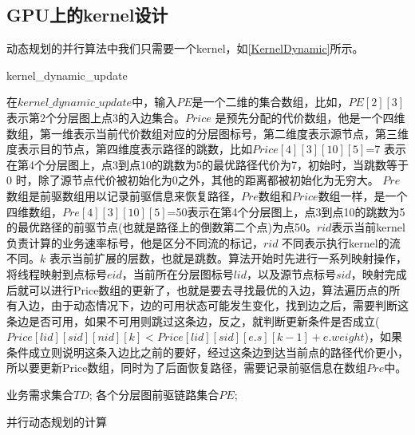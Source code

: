 \subsection{GPU上的kernel设计}
动态规划的并行算法中我们只需要一个kernel，如\ref{KernelDynamic}所示。
\begin{algorithm}[t]
\begin{algorithmic}[1]
\EndIf
\EndIf
\EndFor
\EndFunction
\end{algorithmic}
\caption{kernel\_dynamic\_update}
\label{KernelDynamic}
\end{algorithm}
在$kernel\_dynamic\_update$中，输入$PE$是一个二维的集合数组，比如，$PE[2][3]$表示第2个分层图上点3的入边集合。$Price$ 是预先分配的代价数组，他是一个四维数组，第一维表示当前代价数组对应的分层图标号，第二维度表示源节点，第三维度表示目的节点，第四维度表示路径的跳数，比如$Price[4][3][10][5]$=7 表示在第4个分层图上，点3到点10的跳数为5的最优路径代价为7，初始时，当跳数等于0 时，除了源节点代价被初始化为0之外，其他的距离都被初始化为无穷大。
$Pre$数组是前驱数组用以记录前驱信息来恢复路径，$Pre$数组和$Price$数组一样，是一个四维数组，$Pre[4][3][10][5]$=50表示在第4个分层图上，点3到点10的跳数为5的最优路径的前驱节点(也就是路径上的倒数第二个点)为点50。$rid$表示当前kernel 负责计算的业务速率标号，他是区分不同流的标记，$rid$ 不同表示执行kernel的流不同。$k$ 表示当前扩展的层数，也就是跳数。算法开始时先进行一系列映射操作，将线程映射到点标号$eid$，当前所在分层图标号$lid$，以及源节点标号$sid$，映射完成后就可以进行Price数组的更新了，也就是要去寻找最优的入边，算法遍历点的所有入边，由于动态情况下，边的可用状态可能发生变化，找到边之后，需要判断这条边是否可用，如果不可用则跳过这条边，反之，就判断更新条件是否成立($Price[lid][sid][nid][k]<Price[lid][sid][e.s][k-1]+e.weight$)，如果条件成立则说明这条入边比之前的要好，经过这条边到达当前点的路径代价更小，所以要更新Price数组，同时为了后面恢复路径，需要记录前驱信息在数组$Pre$中。
\begin{algorithm}[t]
\begin{algorithmic}[1]
\Require
业务需求集合$TD$;
各个分层图前驱链路集合$PE$;
\Else
{}
\EndIf
{}
\EndFor
\EndFor
\EndFor
\EndFor
{}
\EndFor
{}
\EndWhile
{}
\end{algorithmic}
\caption{{并行动态规划的计算}}
\label{ParaSPC}
\end{algorithm}


